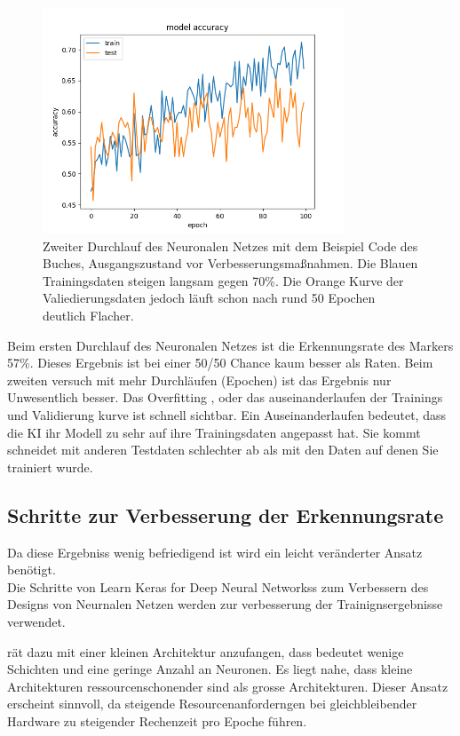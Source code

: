 \documentclass[conference]{IEEEtran}
\begin{document}
\begin{figure}[!h]
	\centering
	\includegraphics[width=9cm]{img/160x120:100@32_accuracy.png}
	\caption{Zweiter Durchlauf des Neuronalen Netzes mit dem Beispiel 
		Code des Buches, Ausgangszustand vor Verbesserungsmaßnahmen. Die 
		Blauen Trainingsdaten steigen langsam gegen 
		70\%. Die Orange Kurve der Valiedierungsdaten jedoch läuft schon 
		nach rund 50 Epochen deutlich Flacher. }
	\label{Initiales Ergebnis}
\end{figure}
Beim ersten Durchlauf des Neuronalen Netzes ist die Erkennungsrate des 
Markers 57\%. Dieses Ergebnis ist bei einer 50/50 Chance kaum besser als 
Raten. Beim zweiten versuch mit mehr Durchläufen (Epochen) ist das 
Ergebnis nur Unwesentlich besser. Das Overfitting , oder das 
auseinanderlaufen der Trainings und Validierung kurve ist schnell sichtbar. 
Ein Auseinanderlaufen bedeutet, dass die KI ihr Modell zu sehr auf ihre 
Trainingsdaten angepasst hat. Sie kommt schneidet mit anderen Testdaten 
schlechter ab als mit den Daten auf denen Sie trainiert wurde. 


	\subsection{Schritte zur Verbesserung der Erkennungsrate} %
Da diese Ergebniss wenig befriedigend ist wird ein leicht veränderter Ansatz 
benötigt. \\
	Die Schritte von \glqq Learn Keras for Deep Neural Networkss\grqq \cite{moolayil2019learn} zum Verbessern des Designs von Neurnalen Netzen werden zur verbesserung der Trainignsergebnisse verwendet. 
	
	\cite{moolayil2019learn} rät dazu mit einer kleinen Architektur anzufangen,
	dass bedeutet wenige Schichten und eine geringe Anzahl an Neuronen. Es 
	liegt nahe, dass kleine Architekturen ressourcenschonender sind als 
	grosse Architekturen. Dieser Ansatz erscheint sinnvoll, da steigende 
	Resourcenanforderngen bei gleichbleibender Hardware zu steigender 
	Rechenzeit pro Epoche führen. \\
	
\end{document}
